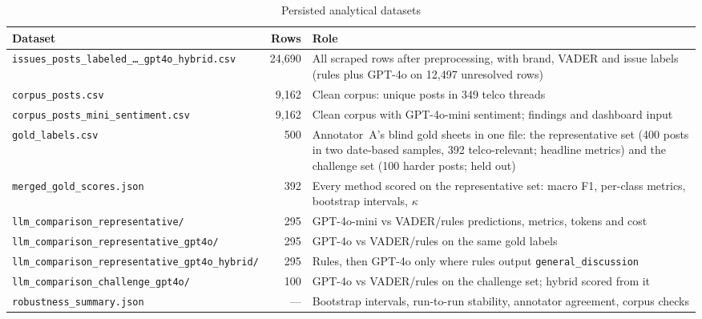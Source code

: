 \documentclass[11pt,a4paper]{article}
\begin{document}
\begin{table}[H]
\centering
\caption{Persisted analytical datasets}
\label{tab:data}
\begin{tabularx}{\textwidth}{@{}p{}rX@{}}
\toprule
\textbf{Dataset} & \textbf{Rows} & \textbf{Role} \\
\midrule
\texttt{issues\_\allowbreak{}posts\_\allowbreak{}labeled\_\allowbreak{}\ldots\_\allowbreak{}gpt4o\_\allowbreak{}hybrid.csv} & 24,690 & All scraped rows after preprocessing, with brand, VADER and issue labels (rules plus GPT-4o on 12,497 unresolved rows) \\
\texttt{corpus\_\allowbreak{}posts.csv} & 9,162 & Clean corpus: unique posts in 349 telco threads \\
\texttt{corpus\_\allowbreak{}posts\_\allowbreak{}mini\_\allowbreak{}sentiment.csv} & 9,162 & Clean corpus with GPT-4o-mini sentiment; findings and dashboard input \\
\texttt{gold\_\allowbreak{}labels.csv} & 500 & Annotator~A's blind gold sheets in one file: the representative set (400 posts in two date-based samples, 392 telco-relevant; headline metrics) and the challenge set (100 harder posts; held out) \\
\texttt{merged\_\allowbreak{}gold\_\allowbreak{}scores.json} & 392 & Every method scored on the representative set: macro F1, per-class metrics, bootstrap intervals, $\kappa$ \\
\texttt{llm\_\allowbreak{}comparison\_\allowbreak{}representative/\allowbreak{}} & 295 & GPT-4o-mini vs VADER/rules predictions, metrics, tokens and cost \\
\texttt{llm\_\allowbreak{}comparison\_\allowbreak{}representative\_\allowbreak{}gpt4o/\allowbreak{}} & 295 & GPT-4o vs VADER/rules on the same gold labels \\
\texttt{llm\_\allowbreak{}comparison\_\allowbreak{}representative\_\allowbreak{}gpt4o\_\allowbreak{}hybrid/\allowbreak{}} & 295 & Rules, then GPT-4o only where rules output \texttt{general\_\allowbreak{}discussion} \\
\texttt{llm\_\allowbreak{}comparison\_\allowbreak{}challenge\_\allowbreak{}gpt4o/\allowbreak{}} & 100 & GPT-4o vs VADER/rules on the challenge set; hybrid scored from it \\
\texttt{robustness\_\allowbreak{}summary.json} & --- & Bootstrap intervals, run-to-run stability, annotator agreement, corpus checks \\
\bottomrule
\end{tabularx}
\end{table}
\end{document}
